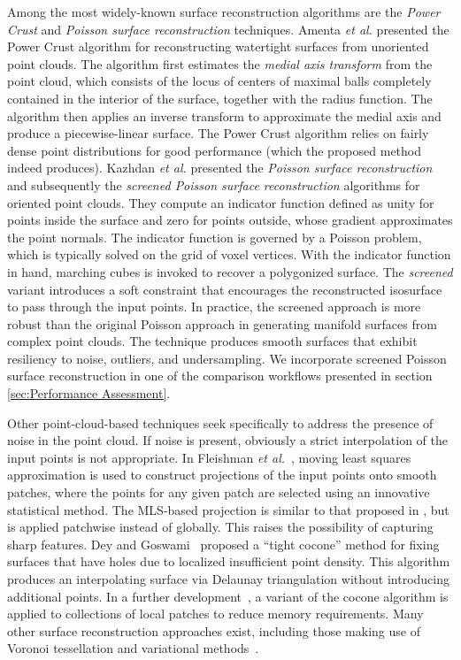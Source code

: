 Among the most widely-known surface reconstruction algorithms are the \textit{Power Crust} and \textit{Poisson surface reconstruction} techniques. Amenta \textit{et al.} \cite{amenta_2001} presented the Power Crust algorithm for reconstructing watertight surfaces from unoriented point clouds. The algorithm first estimates the \textit{medial axis transform} from the point cloud, which consists of the locus of centers of maximal balls completely contained in the interior of the surface, together with the radius function. The algorithm then applies an inverse transform to approximate the medial axis and produce a piecewise-linear surface. The Power Crust algorithm relies on fairly dense point distributions for good performance (which the proposed method indeed produces). Kazhdan \textit{et al.} presented the \textit{Poisson surface reconstruction} \cite{kazhdan_2008} and subsequently the \textit{screened Poisson surface reconstruction} \cite{kazhdan_2013} algorithms for oriented point clouds. They compute an indicator function defined as unity for points inside the surface and zero for points outside, whose gradient approximates the point normals.  The indicator function is governed by a Poisson problem, which is typically solved on the grid of voxel vertices.  With the indicator function in hand, marching cubes is invoked to recover a polygonized surface.  The \textit{screened} variant introduces a soft constraint that encourages the reconstructed isosurface to pass through the input points. In practice, the screened approach is more robust than the original Poisson approach in generating manifold surfaces from complex point clouds. The technique produces smooth surfaces that exhibit resiliency to noise, outliers, and undersampling. We incorporate screened Poisson surface reconstruction in one of the comparison workflows presented in section \ref{sec:Performance Assessment}.

Other point-cloud-based techniques seek specifically to address the presence of noise in the point cloud.  If noise is present, obviously a strict interpolation of the input points is not appropriate.  In Fleishman \textit{et al.}~\cite{fleishman2005}, moving least squares approximation is used to construct projections of the input points onto smooth patches, where the points for any given patch are selected using an innovative statistical method.  The MLS-based projection is similar to that proposed in \cite{levin2004}, but is applied patchwise instead of globally.  This raises the possibility of capturing sharp features. Dey and Goswami~\cite{dey2003} proposed a ``tight cocone'' method for fixing surfaces that have holes due to localized insufficient point density.  This algorithm produces an interpolating surface via Delaunay triangulation without introducing additional points.  In a further development~\cite{dey2011}, a variant of the cocone algorithm is applied to collections of local patches to reduce memory requirements.  Many other surface reconstruction approaches exist, including those making use of Voronoi tessellation and variational methods~\cite{berger}.

